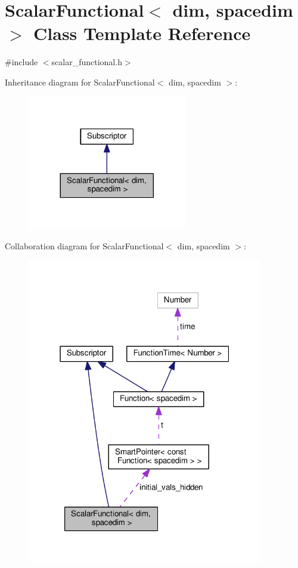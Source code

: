 \hypertarget{class_scalar_functional}{}\section{Scalar\+Functional$<$ dim, spacedim $>$ Class Template Reference}
\label{class_scalar_functional}


{\ttfamily \#include $<$scalar\+\_\+functional.\+h$>$}



Inheritance diagram for Scalar\+Functional$<$ dim, spacedim $>$\+:
\nopagebreak
\begin{figure}[H]
\begin{center}
\leavevmode
\includegraphics[width=197pt]{class_scalar_functional__inherit__graph}
\end{center}
\end{figure}


Collaboration diagram for Scalar\+Functional$<$ dim, spacedim $>$\+:
\nopagebreak
\begin{figure}[H]
\begin{center}
\leavevmode
\includegraphics[width=292pt]{class_scalar_functional__coll__graph}
\end{center}
\end{figure}
